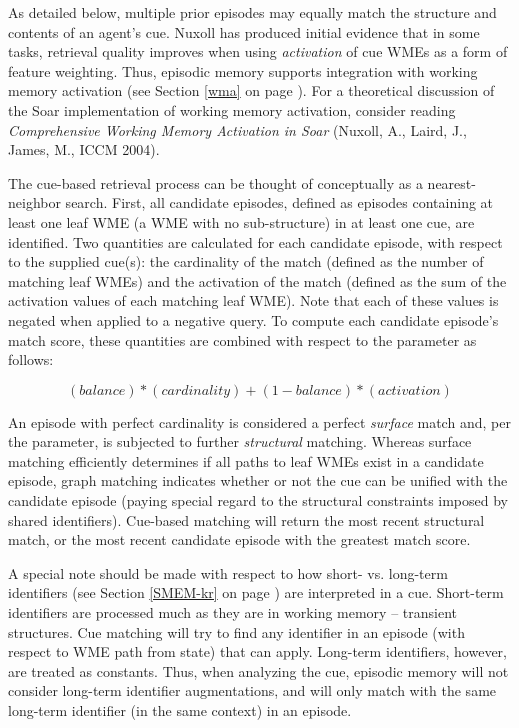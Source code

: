 As detailed below, multiple prior episodes may equally match the structure and contents of an agent's cue. Nuxoll has produced initial evidence that in some tasks, retrieval quality improves when using \emph{activation} of cue WMEs as a form of feature weighting.  Thus, episodic memory supports integration with working memory activation (see Section \ref{wma} on page \pageref{wma}).  For a theoretical discussion of the Soar implementation of working memory activation, consider reading \emph{Comprehensive Working Memory Activation in Soar} (Nuxoll, A., Laird, J., James, M., ICCM 2004).

The cue-based retrieval process can be thought of conceptually as a nearest-neighbor search. First, all candidate episodes, defined as episodes containing at least one leaf WME (a WME with no sub-structure) in at least one cue, are identified.  Two quantities are calculated for each candidate episode, with respect to the supplied cue(s): the cardinality of the match (defined as the number of matching leaf WMEs) and the activation of the match (defined as the sum of the activation values of each matching leaf WME).  Note that each of these values is negated when applied to a negative query.  To compute each candidate episode's match score, these quantities are combined with respect to the  parameter as follows:

$$(balance)*(cardinality) + (1-balance)*(activation)$$

An episode with perfect cardinality is considered a perfect \emph{surface} match and, per the  parameter, is subjected to further \emph{structural} matching.  Whereas surface matching efficiently determines if all paths to leaf WMEs exist in a candidate episode, graph matching indicates whether or not the cue can be unified with the candidate episode (paying special regard to the structural constraints imposed by shared identifiers).  Cue-based matching will return the most recent structural match, or the most recent candidate episode with the greatest match score.

A special note should be made with respect to how short- vs. long-term identifiers (see Section \ref{SMEM-kr} on page \pageref{SMEM-kr}) are interpreted in a cue.  Short-term identifiers are processed much as they are in working memory -- transient structures.  Cue matching will try to find any identifier in an episode (with respect to WME path from state) that can apply.  Long-term identifiers, however, are treated as constants. Thus, when analyzing the cue, episodic memory will not consider long-term identifier augmentations, and will only match with the same long-term identifier (in the same context) in an episode.

